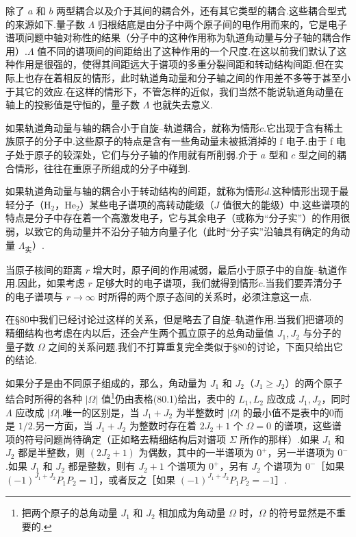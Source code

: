 除了 $a$ 和 $b$ 两型耦合以及介于其间的耦合外，还有其它类型的耦合.这些耦合型式的来源如下.量子数 $\Lambda$ 归根结底是由分子中两个原子间的电作用而来的，它是电子谱项问题中轴对称性的结果（分子中的这种作用称为轨道角动量与分子轴的耦合作用）.$\Lambda$ 值不同的谱项间的间距给出了这种作用的一个尺度.在这以前我们默认了这种作用是很强的，使得其间距远大于谱项的多重分裂间距和转动结构间距.但在实际上也存在着相反的情形，此时轨道角动量和分子轴之间的作用差不多等于甚至小于其它的效应.在这样的情形下，不管怎样的近似，我们当然不能说轨道角动量在轴上的投影值是守恒的，量子数 $\Lambda$ 也就失去意义.

如果轨道角动量与轴的耦合小于自旋–轨道耦合，就称为情形$c$.它出现于含有稀土族原子的分子中.这些原子的特点是含有一些角动量未被抵消掉的 f 电子.由于 f 电子处于原子的较深处，它们与分子轴的作用就有所削弱.介于 $a$ 型和 $c$ 型之间的耦合情形，往往在重原子所组成的分子中碰到.

如果轨道角动量与轴的耦合小于转动结构的间距，就称为情形$d$.这种情形出现于最轻分子（$\mathrm{H}_2$，$\mathrm{He}_2$）某些电子谱项的高转动能级（$J$ 值很大的能级）中.这些谱项的特点是分子中存在着一个高激发电子，它与其余电子（或称为“分子实”）的作用很弱，以致它的角动量并不沿分子轴方向量子化（此时“分子实”沿轴具有确定的角动量 $\Lambda_{\text{实}}$）.

当原子核间的距离 $r$ 增大时，原子间的作用减弱，最后小于原子中的自旋–轨道作用.因此，如果考虑 $r$ 足够大时的电子谱项，我们就得到情形$c$.当我们要弄清分子的电子谱项与 $r\to\infty$ 时所得的两个原子态间的关系时，必须注意这一点.

在§80中我们已经讨论过这样的关系，但是略去了自旋–轨道作用.当我们把谱项的精细结构也考虑在内以后，还会产生两个孤立原子的总角动量值 $J_1,J_2$ 与分子的量子数 $\Omega$ 之间的关系问题.我们不打算重复完全类似于§80的讨论，下面只给出它的结论.

如果分子是由不同原子组成的，那么，角动量为 $J_1$ 和 $J_2$（$J_1\geqslant J_2$）的两个原子结合时所得的各种 $|\Omega|$ 值\footnote{把两个原子的总角动量 $J_1$ 和 $J_2$ 相加成为角动量 $\Omega$ 时，$\Omega$ 的符号显然是不重要的.}仍由表格(80.1)给出，表中的 $L_1,L_2$ 应改成 $J_1,J_2$，同时 $\Lambda$ 应改成 $|\Omega|$.唯一的区别是，当 $J_1+J_2$ 为半整数时 $|\Omega|$ 的最小值不是表中的0而是 $1/2$.另一方面，当 $J_1+J_2$ 为整数时存在着 $2J_2+1$ 个 $\Omega=0$ 的谱项，这些谱项的符号问题尚待确定（正如略去精细结构后对谱项 $\Sigma$ 所作的那样）.如果 $J_1$ 和 $J_2$ 都是半整数，则 $(2J_2+1)$ 为偶数，其中的一半谱项为 $0^+$，另一半谱项为 $0^-$.如果 $J_1$ 和 $J_2$ 都是整数，则有 $J_2+1$ 个谱项为 $0^+$，另有 $J_2$ 个谱项为 $0^-$［如果 $(-1)^{J_1+J_2}P_1P_2=1$］，或者反之［如果 $(-1)^{J_1+J_2}P_1P_2=-1$］.

